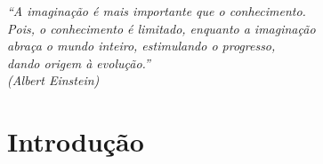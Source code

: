 \documentclass[
	12pt,				%
	openright,			%
	oneside,
	a4paper,			%
	english,			%
	french,				%
	spanish,			%
	brazil				%
	]{abntex2}
\begin{document}
\frenchspacing 


\imprimircapa
\imprimirfolhaderosto









\begin{epigrafe}
    \vspace*{\fill}
	\begin{flushright}
		\textit{``A imaginação é mais importante que o conhecimento. \\
		        Pois, o conhecimento é limitado, enquanto a imaginação \\
		        abraça o mundo inteiro, estimulando o progresso, \\
		        dando origem à evolução.''\\
		(Albert Einstein)}
	\end{flushright}
\end{epigrafe}







\listoffigures*
\cleardoublepage

\listoftables*
\cleardoublepage



%

\renewcommand{\listingscaption}{Algoritmo}
\renewcommand{\listoflistingscaption}{Lista de Códigos Fonte}
\listoflistings
\cleardoublepage


{
  \hypersetup{linkcolor=black}
  \tableofcontents*
}
\cleardoublepage

\part{Introdução}
\end{document}

